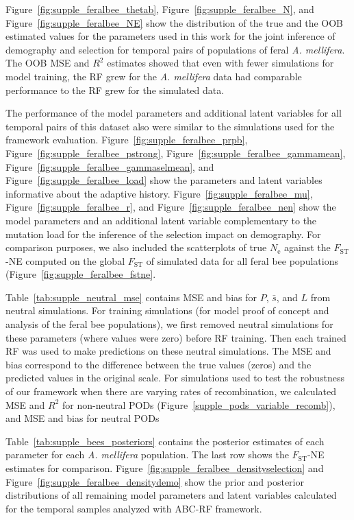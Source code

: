\documentclass[a4paper, 12pt]{article}
\begin{document}
Figure~\ref{fig:supple_feralbee_thetab}, Figure~\ref{fig:supple_feralbee_N}, and Figure~\ref{fig:supple_feralbee_NE} show the distribution of the true and the OOB estimated values for the parameters used in this work for the joint inference of demography and selection for temporal pairs of populations of feral \textit{A. mellifera}. The OOB MSE and $R^2$ estimates showed that even with fewer simulations for model training, the RF grew for the  \textit{A. mellifera} data had comparable performance to the RF grew for the simulated data.

The performance of the model parameters and additional latent variables for all temporal pairs of this dataset also were similar to the simulations used for the framework evaluation. Figure~\ref{fig:supple_feralbee_prpb}, Figure~\ref{fig:supple_feralbee_pstrong}, Figure~\ref{fig:supple_feralbee_gammamean}, Figure~\ref{fig:supple_feralbee_gammaselmean}, and Figure~\ref{fig:supple_feralbee_load} show the parameters and latent variables informative about the adaptive history. Figure~\ref{fig:supple_feralbee_mu}, Figure~\ref{fig:supple_feralbee_r}, and Figure~\ref{fig:supple_feralbee_nen} show the model parameters and an additional latent variable complementary to the mutation load for the inference of the selection impact on demography. For comparison purposes, we also included the scatterplots of true $N_{\mathrm{e}}$ against the $F_{\mathrm{ST}}$-NE computed on the global $F_{\mathrm{ST}}$ of simulated data for all feral bee populations (Figure~\ref{fig:supple_feralbee_fstne}.

Table~\ref{tab:supple_neutral_mse} contains MSE and bias for $P$, $\bar{s}$, and $L$ from neutral simulations. For training simulations (for model proof of concept and analysis of the feral bee populations), we first removed neutral simulations for these parameters (where values were zero) before RF training. Then each trained RF was used to make predictions on these neutral simulations. The MSE and bias correspond to the difference between the true values (zeros) and the predicted values in the original scale. For simulations used to test the robustness of our framework when there are varying rates of recombination, we calculated MSE and $R^2$ for non-neutral PODs (Figure~\ref{supple_pods_variable_recomb}), and  MSE and bias for neutral PODs

Table~\ref{tab:supple_bees_posteriors} contains the posterior estimates of each parameter for each \textit{A. mellifera} population. The last row shows the $F_{\mathrm{ST}}$-NE estimates for comparison. Figure~\ref{fig:supple_feralbee_densityselection} and Figure~\ref{fig:supple_feralbee_densitydemo} show the prior and posterior distributions of all remaining model parameters and latent variables calculated for the temporal samples analyzed with ABC-RF framework.\\
\end{document}
